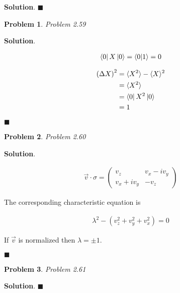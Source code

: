 \documentclass[12pt]{article}
\newtheorem{p}{Problem}
\theoremstyle{definition}
\newenvironment{s}{%
        \begin{trivlist} \item \textbf{Solution}. }{%
            \hspace*{\fill} $\blacksquare$\end{trivlist}}%
\begin{document}
{\begin{s}
\end{s}

\begin{p}
Problem 2.59
\end{p}

\begin{s}

\begin{align*}
\bra{0}X\ket{0} = \bra{0}\ket{1} = 0
\end{align*}

\begin{align*}
\left(\Delta X\right)^{2} &= \langle X^{2} \rangle - \langle X\rangle^{2}\\
&= \langle X^{2} \rangle \\
&= \bra{0}X^{2}\ket{0}\\
&= 1
\end{align*}

\end{s}

\begin{p}
Problem 2.60
\end{p}

\begin{s}

\begin{align*}
\vec{v}\cdot \sigma =
\begin{pmatrix}
v_{z} & v_{x} - iv_{y}\\
v_{x}+iv_{y} & -v_{z}
\end{pmatrix}
\end{align*}

The corresponding characteristic equation is

\begin{align*}
\lambda^{2} - (v_{z}^{2} + v_{y}^{2} + v_{x}^{2}) = 0
\end{align*}

If $\vec{v}$ is normalized then $\lambda = \pm 1$.


\end{s}
\begin{p}
Problem 2.61
\end{p}

\begin{s}
\end{s}
\end{document}
